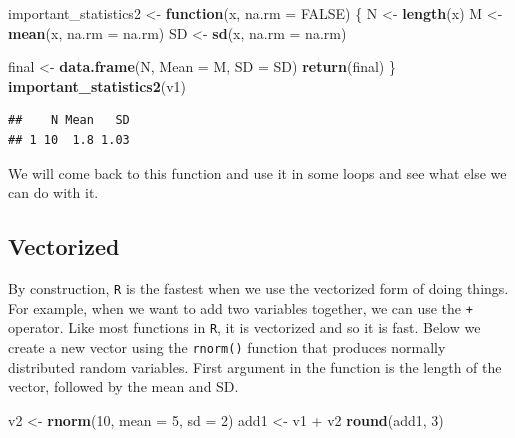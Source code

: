 \documentclass[]{tufte-book}
\newenvironment{Shaded}{}{}
\newcommand{\KeywordTok}[1]{\textcolor[rgb]{0.00,0.44,0.13}{\textbf{#1}}}
\newcommand{\DataTypeTok}[1]{\textcolor[rgb]{0.56,0.13,0.00}{#1}}
\newcommand{\DecValTok}[1]{\textcolor[rgb]{0.25,0.63,0.44}{#1}}
\newcommand{\StringTok}[1]{\textcolor[rgb]{0.25,0.44,0.63}{#1}}
\newcommand{\OtherTok}[1]{\textcolor[rgb]{0.00,0.44,0.13}{#1}}
\newcommand{\ControlFlowTok}[1]{\textcolor[rgb]{0.00,0.44,0.13}{\textbf{#1}}}
\newcommand{\OperatorTok}[1]{\textcolor[rgb]{0.40,0.40,0.40}{#1}}
\newcommand{\NormalTok}[1]{#1}
\theoremstyle{definition}
\theoremstyle{definition}
\theoremstyle{remark}
\begin{document}
\begin{Shaded}
\begin{Highlighting}[]
\NormalTok{important_statistics2 <-}\StringTok{ }\ControlFlowTok{function}\NormalTok{(x, }\DataTypeTok{na.rm =} \OtherTok{FALSE}\NormalTok{) \{}
\NormalTok{    N <-}\StringTok{ }\KeywordTok{length}\NormalTok{(x)}
\NormalTok{    M <-}\StringTok{ }\KeywordTok{mean}\NormalTok{(x, }\DataTypeTok{na.rm =}\NormalTok{ na.rm)}
\NormalTok{    SD <-}\StringTok{ }\KeywordTok{sd}\NormalTok{(x, }\DataTypeTok{na.rm =}\NormalTok{ na.rm)}
    
\NormalTok{    final <-}\StringTok{ }\KeywordTok{data.frame}\NormalTok{(N, }\DataTypeTok{Mean =}\NormalTok{ M, }\DataTypeTok{SD =}\NormalTok{ SD)}
    \KeywordTok{return}\NormalTok{(final)}
\NormalTok{\}}
\KeywordTok{important_statistics2}\NormalTok{(v1)}
\end{Highlighting}
\end{Shaded}

\begin{verbatim}
##    N Mean   SD
## 1 10  1.8 1.03
\end{verbatim}

We will come back to this function and use it in some loops and see what
else we can do with it.

\subsection*{Vectorized}\label{vectorized}

By construction, \texttt{R} is the fastest when we use the vectorized
form of doing things. For example, when we want to add two variables
together, we can use the \texttt{+} operator. Like most functions in
\texttt{R}, it is vectorized and so it is fast. Below we create a new
vector using the \texttt{rnorm()} function that produces normally
distributed random variables. First argument in the function is the
length of the vector, followed by the mean and SD.

\begin{Shaded}
\begin{Highlighting}[]
\NormalTok{v2 <-}\StringTok{ }\KeywordTok{rnorm}\NormalTok{(}\DecValTok{10}\NormalTok{, }\DataTypeTok{mean =} \DecValTok{5}\NormalTok{, }\DataTypeTok{sd =} \DecValTok{2}\NormalTok{)}
\NormalTok{add1 <-}\StringTok{ }\NormalTok{v1 }\OperatorTok{+}\StringTok{ }\NormalTok{v2}
\KeywordTok{round}\NormalTok{(add1, }\DecValTok{3}\NormalTok{)}
\end{Highlighting}
\end{Shaded}
\end{document}
